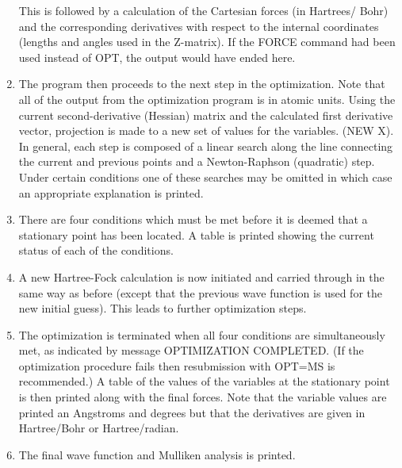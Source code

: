 \begin{enumerate}
This is followed by a calculation of the Cartesian forces (in Hartrees/
Bohr) and the corresponding derivatives with respect to the internal
coordinates (lengths and angles used in the Z-matrix).  If the FORCE
command had been used instead of OPT, the output would have ended here.
\item The program then proceeds to the next step in the optimization.
Note that all of the output from the optimization program is in atomic
units.  Using the current second-derivative (Hessian) matrix and the
calculated first derivative vector, projection is made to a new set of
values for the variables. (NEW X).  In general, each step is composed
of a linear search along the line connecting the current and previous
points and a Newton-Raphson (quadratic) step.  Under certain conditions
one of these searches may be omitted in which case an appropriate
explanation is printed.
\item There are four conditions which must be met before it is deemed that
a stationary point has been located.  A table is printed showing the
current status of each of the conditions.
\item A new Hartree-Fock calculation is now initiated and carried through
in the same way as before (except that the previous wave function is
used for the new initial guess).  This leads to further optimization
steps.
\item The optimization is terminated when all four conditions are
simultaneously met, as indicated by message OPTIMIZATION COMPLETED.
(If the optimization procedure fails then resubmission with OPT=MS is
recommended.)  A table of the values of the variables at the stationary
point is then printed along with the final forces.  Note that the
variable values are printed an Angstroms and degrees but that the
derivatives are given in Hartree/Bohr or Hartree/radian.
\item The final wave function and Mulliken analysis is printed.
\end{enumerate}
